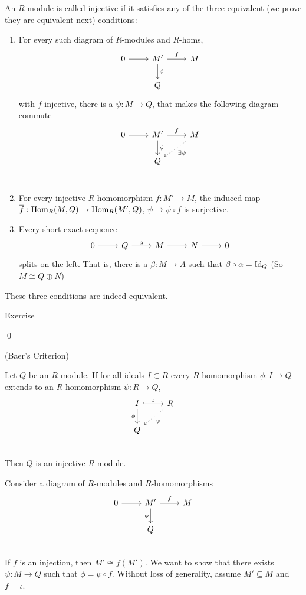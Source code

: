\documentclass[x11names,reqno,14pt]{extarticle}
\begin{document}
An $R$-module is called \underline{injective} if it satisfies any of the three equivalent (we prove they are equivalent next) conditions:

\begin{enumerate}[label=(\roman*)]

\item For every such diagram of $R$-modules and $R$-homs, 
\[
\begin{tikzcd}
0\ar[r] & M'\ar[r, "f"]\ar[d, "\phi"] &M \\
& Q& 
\end{tikzcd}
\]
with $f$ injective, there is a $\psi:M\to Q$, that makes the following diagram commute
\[
\begin{tikzcd}
0\ar[r]&M'\ar[d, "\phi"]\ar[r, "f"]&M\ar[dl, dotted, "\exists\psi
"] \\
&Q& \\
\end{tikzcd}
\]

\item For every injective $R$-homomorphism $f:M'\to M$, the induced map $\overline{f}:{\mathrm{Hom}}_R(M, Q)\to{\mathrm{Hom}}_R(M', Q)$, $\psi\mapsto\psi\circ f$ is surjective. 

\item Every short exact sequence
\[
\exactshort{Q}{\alpha}{M}{}{N}
\]
splits on the left. That is, there is a $\beta:M\to A$ such that $\beta\circ\alpha=\operatorname{\mathrm{Id}}_Q$ (So $M\cong Q\oplus N$)

\end{enumerate}


\thm 

These three conditions are indeed equivalent.

\proof

Exercise

\qed

\lem (Baer's Criterion)

Let $Q$ be an $R$-module. If for all ideals $I\subset R$ every $R$-homomorphism $\phi:I\to Q$ extends to an $R$-homomorphism $\psi:R\to Q$,
\[
\begin{tikzcd}
I\ar[r, hook, "\iota"] \ar[d, "\phi"']& R\ar[dl, dotted, "\psi"] \\
Q & \\
\end{tikzcd}
\]
Then $Q$ is an injective $R$-module. 

\proof

Consider a diagram of $R$-modules and $R$-homomorphisms 
\[
\begin{tikzcd}
0\ar[r]&M'\ar[d, "\phi"']\ar[r, "f"]&M \\
& Q& \\
\end{tikzcd}
\]
If $f$ is an injection, then $M'\cong f(M')$. We want to show that there exists $\psi:M\to Q$ such that $\phi = \psi\circ f$. Without loss of generality, assume $M'\subseteq M$ and $f=\iota$. 
\end{document}
